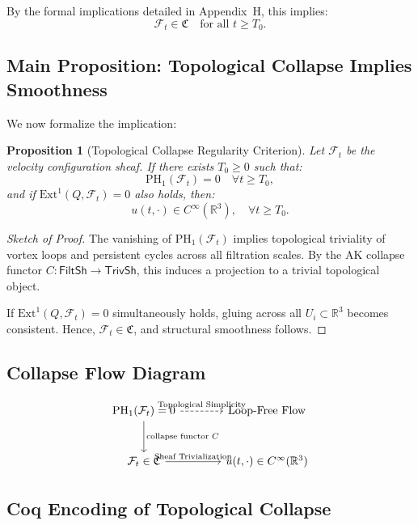 \documentclass[11pt]{article}
\newtheorem{proposition}[theorem]{Proposition}
\begin{document}
By the formal implications detailed in Appendix~H, this implies:
\[
\mathcal{F}_t \in \mathfrak{C} \quad \text{for all } t \geq T_0.
\]


\subsection{Main Proposition: Topological Collapse Implies Smoothness}

We now formalize the implication:

\begin{proposition}[Topological Collapse Regularity Criterion]
\label{prop:ph1-collapse-regularity}
Let \( \mathcal{F}_t \) be the velocity configuration sheaf. If there exists \( T_0 \geq 0 \) such that:
\[
\mathrm{PH}_1(\mathcal{F}_t) = 0 \quad \forall t \geq T_0,
\]
and if \( \mathrm{Ext}^1(Q, \mathcal{F}_t) = 0 \) also holds, then:
\[
u(t, \cdot) \in C^\infty(\mathbb{R}^3), \quad \forall t \geq T_0.
\]
\end{proposition}

\begin{proof}[Sketch of Proof]
The vanishing of \( \mathrm{PH}_1(\mathcal{F}_t) \) implies topological triviality of vortex loops and persistent cycles across all filtration scales. By the AK collapse functor \( C: \mathsf{FiltSh} \to \mathsf{TrivSh} \), this induces a projection to a trivial topological object.

If \( \mathrm{Ext}^1(Q, \mathcal{F}_t) = 0 \) simultaneously holds, gluing across all \( U_i \subset \mathbb{R}^3 \) becomes consistent. Hence, \( \mathcal{F}_t \in \mathfrak{C} \), and structural smoothness follows.
\end{proof}

\subsection{Collapse Flow Diagram}

\[
\begin{tikzcd}[row sep=large, column sep=large]
\mathrm{PH}_1(\mathcal{F}_t) = 0
\arrow[d, "\text{collapse functor } C"]
\arrow[r, dashed, "\text{Topological Simplicity}"]
& \text{Loop-Free Flow} \\
\mathcal{F}_t \in \mathfrak{C}
\arrow[r, "\text{Sheaf Trivialization}"]
& u(t, \cdot) \in C^\infty(\mathbb{R}^3)
\end{tikzcd}
\]

\subsection{Coq Encoding of Topological Collapse}
\end{document}
